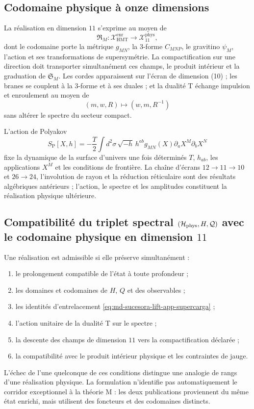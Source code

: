 \subsection{Codomaine physique à onze dimensions}

La réalisation en dimension \(11\) s'exprime au moyen de
\[
 \mathfrak R_M:\mathcal X_{\mathrm{HMT}}^{\mathrm{enr}}
 \longrightarrow
 \mathcal X_{11}^{\mathrm{phys}},
\]
dont le codomaine porte la métrique \(g_{MN}\), la \(3\)-forme \(C_{MNP}\), le
gravitino \(\psi_M\), l'action et ses transformations de supersymétrie. La
compactification sur une direction doit transporter simultanément ces
champs, le produit intérieur et la graduation de \(\mathfrak S_M\). Les cordes
apparaissent sur l'écran de dimension (10) ; les branes se couplent à la
\(3\)-forme et à ses duales ; et la dualité T échange impulsion et
enroulement au moyen de
\[
 (m,w,R)\longmapsto(w,m,R^{-1})
\]
sans altérer le spectre du secteur compact.

L'action de Polyakov
\[
 S_{\mathrm P}[X,h]
 =-\frac{T}{2}\int d^2\sigma\,
 \sqrt{-h}\,h^{ab}g_{MN}(X)
 \partial_aX^M\partial_bX^N
\]
fixe la dynamique de la surface d'univers une fois déterminés \(T\),
\(h_{ab}\), les applications \(X^M\) et les conditions de frontière. La chaîne
d'écrans \(12\to11\to10\) et \(26\to24\), l'involution de rayon et la
réduction réticulaire sont des résultats algébriques antérieurs ; l'action, le
spectre et les amplitudes constituent la réalisation physique ultérieure.

\subsection{Compatibilité du triplet spectral \((\mathcal H_{\rm phys},H,\mathcal Q)\) avec le codomaine physique en dimension \(11\)}

Une réalisation est admissible si elle préserve simultanément :
\begin{enumerate}
 \item le prolongement compatible de l'état à toute profondeur ;
 \item les domaines et codomaines de \(H\), \(Q\) et des observables ;
 \item les identités d'entrelacement
       \eqref{eq:md-sucesora-lift-app-supercarga} ;
 \item l'action unitaire de la dualité T sur le spectre ;
 \item la descente des champs de dimension \(11\) vers la compactification
       déclarée ;
 \item la compatibilité avec le produit intérieur physique et les contraintes
       de jauge.
\end{enumerate}
L'échec de l'une quelconque de ces conditions distingue une analogie de rangs
d'une réalisation physique. La formulation n'identifie pas automatiquement le
corridor exceptionnel à la théorie M : les deux publications proviennent du même
état enrichi, mais utilisent des foncteurs et des codomaines distincts.

